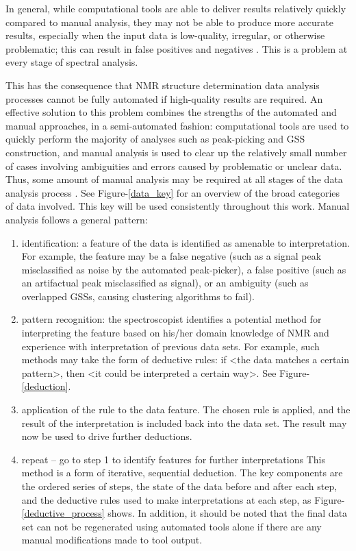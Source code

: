 In general, while computational tools are able to deliver results relatively 
quickly compared to manual analysis, they may not be able to produce more 
accurate results, especially when the input data is low-quality, irregular, or 
otherwise problematic; this can result in false positives and negatives
\cite{williamson2009automated}.  This is a problem at every stage of spectral
analysis.

This has the consequence that NMR structure determination data analysis 
processes cannot be fully automated if high-quality results are required.  
An effective solution to this problem combines the strengths of the automated 
and manual approaches, in a semi-automated fashion:  computational tools are 
used to quickly perform the majority of analyses such as peak-picking and 
GSS construction, and manual analysis is used to clear up the 
relatively small number of cases involving ambiguities and errors caused 
by problematic or unclear data.  Thus, some amount of manual analysis may 
be required at all stages of the data analysis process 
\cite{guntert2009automated, williamson2009automated}.   
See Figure-\ref{data_key} for an overview of the broad categories of data 
involved.  This key will be used consistently throughout this work.
Manual analysis follows a general pattern:
\begin{enumerate}
  \item identification: a feature of the data is identified as amenable to 
  interpretation.  For example, the feature may be a false negative (such as 
  a signal peak misclassified as noise by the automated peak-picker), a false 
  positive (such as an artifactual peak misclassified as signal), or an 
  ambiguity (such as overlapped GSSs, causing clustering algorithms to fail).
  \item pattern recognition: the spectroscopist identifies a potential method 
  for interpreting the feature based on his/her domain knowledge of NMR and 
  experience with interpretation of previous data sets.  For example, such 
  methods may take the form of deductive rules:  if <the data matches a 
  certain pattern>, then <it could be interpreted a certain way>. 
  See Figure-\ref{deduction}.
  \item application of the rule to the data feature.  The chosen rule is 
  applied, and the result of the interpretation is included back into the 
  data set.  The result may now be used to drive further deductions.
  \item repeat -- go to step 1 to identify features for further interpretations
This method is a form of iterative, sequential deduction.  The key components 
are the ordered series of steps, the state of the data before and after each 
step, and the deductive rules used to make interpretations at each step, as
 Figure-\ref{deductive_process} shows.  In 
addition, it should be noted that the final data set can not be regenerated 
using automated tools alone if there are any manual modifications made to 
tool output.
\end{enumerate}


